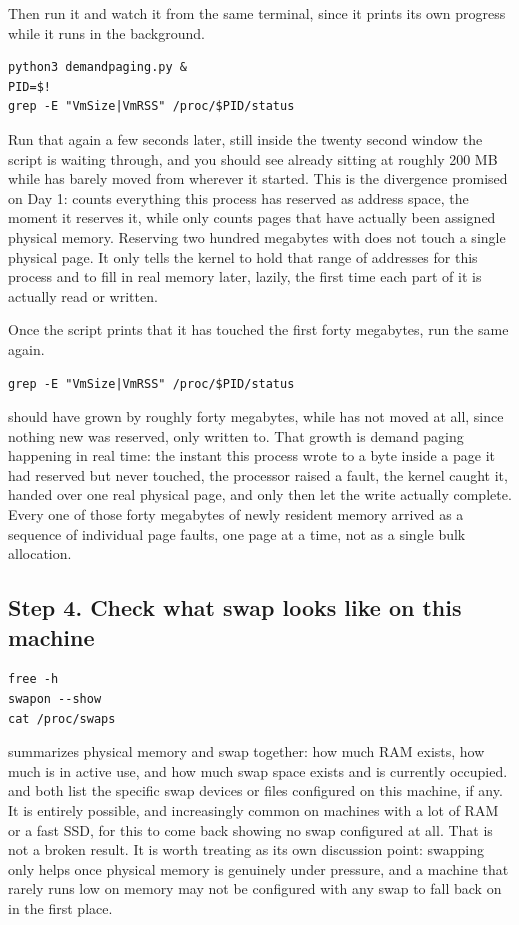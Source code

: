 \documentclass[11pt]{article}
\begin{document}
Then run it and watch it from the same terminal, since it prints its own progress while it runs in the background.

\begin{lstlisting}
python3 demandpaging.py &
PID=$!
grep -E "VmSize|VmRSS" /proc/$PID/status
\end{lstlisting}

Run that  again a few seconds later, still inside the twenty second window the script is waiting through, and you should see  already sitting at roughly 200 MB while  has barely moved from wherever it started. This is the divergence promised on Day 1:  counts everything this process has reserved as address space, the moment it reserves it, while  only counts pages that have actually been assigned physical memory. Reserving two hundred megabytes with  does not touch a single physical page. It only tells the kernel to hold that range of addresses for this process and to fill in real memory later, lazily, the first time each part of it is actually read or written.

Once the script prints that it has touched the first forty megabytes, run the same  again.

\begin{lstlisting}
grep -E "VmSize|VmRSS" /proc/$PID/status
\end{lstlisting}

 should have grown by roughly forty megabytes, while  has not moved at all, since nothing new was reserved, only written to. That growth is demand paging happening in real time: the instant this process wrote to a byte inside a page it had reserved but never touched, the processor raised a fault, the kernel caught it, handed over one real physical page, and only then let the write actually complete. Every one of those forty megabytes of newly resident memory arrived as a sequence of individual page faults, one page at a time, not as a single bulk allocation.

\subsection*{Step 4. Check what swap looks like on this machine}

\begin{lstlisting}
free -h
swapon --show
cat /proc/swaps
\end{lstlisting}

 summarizes physical memory and swap together: how much RAM exists, how much is in active use, and how much swap space exists and is currently occupied.  and  both list the specific swap devices or files configured on this machine, if any. It is entirely possible, and increasingly common on machines with a lot of RAM or a fast SSD, for this to come back showing no swap configured at all. That is not a broken result. It is worth treating as its own discussion point: swapping only helps once physical memory is genuinely under pressure, and a machine that rarely runs low on memory may not be configured with any swap to fall back on in the first place.
\end{document}
